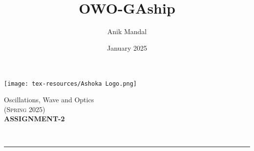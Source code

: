 \documentclass[12pt, a4paper]{article}
\title{OWO-GAship}
\author{Anik Mandal}
\date{January 2025}
\begin{document}
\begin{minipage}[t][][c]{0.1\textwidth}
    \begin{flushleft}
        \texttt{[image: tex-resources/Ashoka Logo.png]}
    \end{flushleft}
\end{minipage}
\begin{minipage}[t][][c]{0.85\textwidth}
    \begin{center}
        {\LARGE Oscillations, Wave and Optics}\\ \vspace{0.5em}
        \textsc{(Spring 2025)}\\
        \vspace{1em}
        \textbf{\Large ASSIGNMENT-2} \\
    \end{center}
\end{minipage}
\vspace{10pt}\\
\rule[0em]{\textwidth}{0.75pt}
\end{document}
